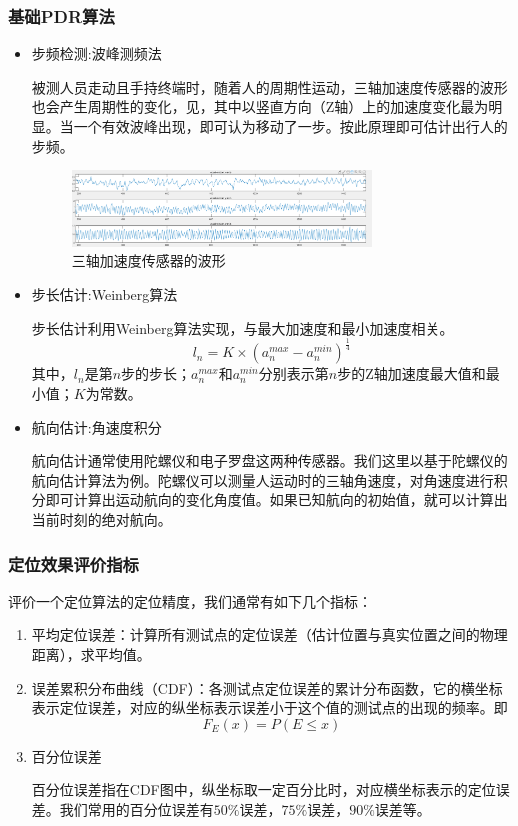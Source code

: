 \documentclass[a4paper]{article}
\begin{document}
\subsubsection{基础PDR算法}
\begin{itemize}
    \item 步频检测:波峰测频法 
    
    被测人员走动且手持终端时，随着人的周期性运动，三轴加速度传感器的波形也会产生周期性的变化，见，其中以竖直方向（Z轴）上的加速度变化最为明显。当一个有效波峰出现，即可认为移动了一步。按此原理即可估计出行人的步频。
    \begin{figure}[htbp]
    	\centering
    	\includegraphics[width=0.75\textwidth]{fig/accxyz.png}
    	\caption{三轴加速度传感器的波形}
    	\label{accxyz}
    \end{figure}  
    \item 步长估计:Weinberg算法 
    
    步长估计利用Weinberg算法实现，与最大加速度和最小加速度相关。
    $$ l_n = K \times \left( a_n^{max} - a_n^{min}\right)^{ \frac{1}{4}}$$
    其中，$l_n$是第$n$步的步长；$a_n^{max}$和$a_n^{min}$分别表示第$n$步的Z轴加速度最大值和最小值；$K$为常数。
    \item 航向估计:角速度积分

    航向估计通常使用陀螺仪和电子罗盘这两种传感器。我们这里以基于陀螺仪的航向估计算法为例。陀螺仪可以测量人运动时的三轴角速度，对角速度进行积分即可计算出运动航向的变化角度值。如果已知航向的初始值，就可以计算出当前时刻的绝对航向。
\end{itemize}
\subsubsection{定位效果评价指标}
评价一个定位算法的定位精度，我们通常有如下几个指标：
\begin{enumerate}
    \item 平均定位误差：计算所有测试点的定位误差（估计位置与真实位置之间的物理距离），求平均值。
    \item 误差累积分布曲线（CDF）：各测试点定位误差的累计分布函数，它的横坐标表示定位误差，对应的纵坐标表示误差小于这个值的测试点的出现的频率。即$$F_E(x) = P(E\leq x)$$
    \item 百分位误差

    百分位误差指在CDF图中，纵坐标取一定百分比时，对应横坐标表示的定位误差。我们常用的百分位误差有$50\%$误差，$75\%$误差，$90\%$误差等。
\end{enumerate}
\end{document}

